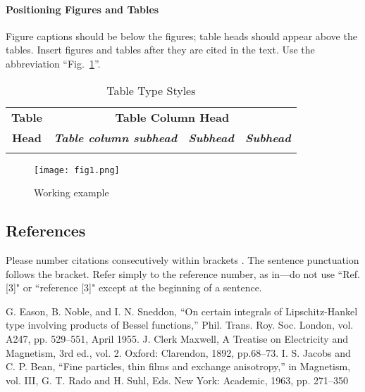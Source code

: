 \documentclass[conference]{IEEEtran}
\begin{document}
\paragraph{Positioning Figures and Tables} Figure captions should be 
below the figures; table heads should appear above the tables. Insert 
figures and tables after they are cited in the text. Use the abbreviation 
``Fig.~\ref{fig1}''.

\begin{table}[h]
    \label{tb1}
    \caption{Table Type Styles}
    \centering
    \begin{tabular}{|c||c|c|c|}
    \hline
    \textbf{Table}& \multicolumn{3}{|c|}{\textbf{Table Column Head}}\\
    \cline{2-4}
    \textbf{Head}& \textbf{\textit{Table column subhead}} &\textbf{\textit{Subhead}} &\textit{\textbf{Subhead}} \\
    \hline
    & & & \\
    \hline
    \end{tabular}
\end{table}

\begin{figure}[h]
    \centering
    \texttt{[image: fig1.png]}
    \caption{Working example}
    \label{fig1}
\end{figure}


\subsection{References}
Please number citations consecutively within brackets \cite{b1}. The sentence punctuation follows the bracket\cite{b2}. Refer simply to the reference number, as in\cite{b3}---do not use ``Ref. [3]" or ``reference [3]" except at the beginning of a sentence. 

\begin{thebibliography}{00}
 G. Eason, B. Noble, and I. N. Sneddon, ``On certain integrals of Lipschitz-Hankel type involving products of Bessel functions,'' Phil. Trans. Roy. Soc. London, vol. A247, pp. 529--551, April 1955.
 J. Clerk Maxwell, A Treatise on Electricity and Magnetism, 3rd ed., vol. 2. Oxford: Clarendon, 1892, pp.68--73.
 I. S. Jacobs and C. P. Bean, ``Fine particles, thin films and exchange anisotropy,'' in Magnetism, vol. III, G. T. Rado and H. Suhl, Eds. New York: Academic, 1963, pp. 271--350
\end{thebibliography}
\end{document}
